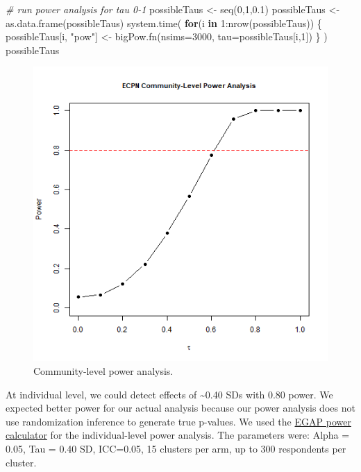 \documentclass[
]{article}
\newenvironment{Shaded}{\begin{snugshade}}{\end{snugshade}}
\newcommand{\AttributeTok}[1]{\textcolor[rgb]{0.77,0.63,0.00}{#1}}
\newcommand{\CommentTok}[1]{\textcolor[rgb]{0.56,0.35,0.01}{\textit{#1}}}
\newcommand{\ControlFlowTok}[1]{\textcolor[rgb]{0.13,0.29,0.53}{\textbf{#1}}}
\newcommand{\DecValTok}[1]{\textcolor[rgb]{0.00,0.00,0.81}{#1}}
\newcommand{\FloatTok}[1]{\textcolor[rgb]{0.00,0.00,0.81}{#1}}
\newcommand{\FunctionTok}[1]{\textcolor[rgb]{0.00,0.00,0.00}{#1}}
\newcommand{\NormalTok}[1]{#1}
\newcommand{\OtherTok}[1]{\textcolor[rgb]{0.56,0.35,0.01}{#1}}
\newcommand{\SpecialCharTok}[1]{\textcolor[rgb]{0.00,0.00,0.00}{#1}}
\newcommand{\StringTok}[1]{\textcolor[rgb]{0.31,0.60,0.02}{#1}}
\begin{document}
\begin{Shaded}
\begin{Highlighting}[]
\CommentTok{\# run power analysis for tau 0{-}1}
\NormalTok{possibleTaus }\OtherTok{\textless{}{-}} \FunctionTok{seq}\NormalTok{(}\DecValTok{0}\NormalTok{,}\DecValTok{1}\NormalTok{,}\FloatTok{0.1}\NormalTok{)}
\NormalTok{possibleTaus }\OtherTok{\textless{}{-}} \FunctionTok{as.data.frame}\NormalTok{(possibleTaus)}
\FunctionTok{system.time}\NormalTok{(}
\ControlFlowTok{for}\NormalTok{(i }\ControlFlowTok{in} \DecValTok{1}\SpecialCharTok{:}\FunctionTok{nrow}\NormalTok{(possibleTaus))}
\NormalTok{\{}
\NormalTok{  possibleTaus[i, }\StringTok{"pow"}\NormalTok{] }\OtherTok{\textless{}{-}} \FunctionTok{bigPow.fn}\NormalTok{(}\AttributeTok{nsims=}\DecValTok{3000}\NormalTok{, }\AttributeTok{tau=}\NormalTok{possibleTaus[i,}\DecValTok{1}\NormalTok{])}
\NormalTok{\}}
\NormalTok{)}
\NormalTok{possibleTaus}
\end{Highlighting}
\end{Shaded}

\begin{figure}[H]
\centering
\includegraphics[width=\linewidth]{../data_and_code/review/power_figure.png}
\caption{Community-level power analysis.}\label{fig:pow_comm}
\end{figure}

At individual level, we could detect effects of \textasciitilde0.40 SDs
with 0.80 power. We expected better power for our actual analysis
because our power analysis does not use randomization inference to
generate true p-values. We used the
\href{https://egap.shinyapps.io/power-app/}{EGAP power calculator} for
the individual-level power analysis. The parameters were: Alpha = 0.05,
Tau = 0.40 SD, ICC=0.05, 15 clusters per arm, up to 300 respondents per
cluster.
\end{document}
